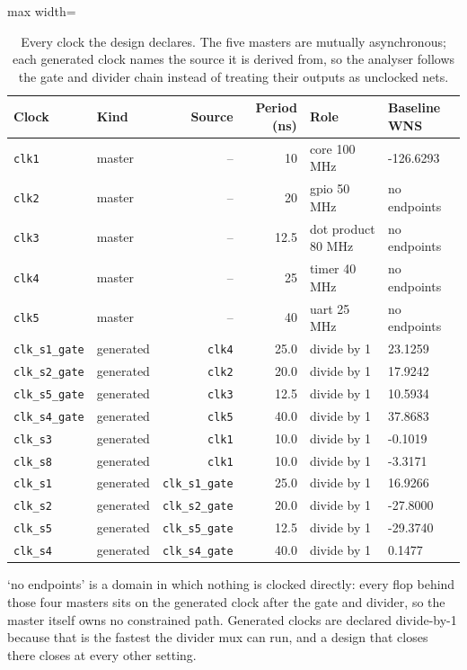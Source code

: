 \begin{table}[htbp]
  \centering
  \footnotesize
  \caption{Every clock the design declares. The five masters are mutually asynchronous; each generated clock names the source it is derived from, so the analyser follows the gate and divider chain instead of treating their outputs as unclocked nets.}
  \label{tab:clocks}
  \begin{adjustbox}{max width=\textwidth}
  \begin{tabular}{llrrll}
    \toprule
    \textbf{Clock} & \textbf{Kind} & \textbf{Source} & \textbf{Period (ns)} & \textbf{Role} & \textbf{Baseline WNS} \\
    \midrule
    \texttt{clk1} & master & -- & 10 & core        100 MHz & -126.6293 \\
    \texttt{clk2} & master & -- & 20 & gpio         50 MHz & {\footnotesize no endpoints} \\
    \texttt{clk3} & master & -- & 12.5 & dot product  80 MHz & {\footnotesize no endpoints} \\
    \texttt{clk4} & master & -- & 25 & timer        40 MHz & {\footnotesize no endpoints} \\
    \texttt{clk5} & master & -- & 40 & uart         25 MHz & {\footnotesize no endpoints} \\
    \texttt{clk\_s1\_gate} & generated & \texttt{clk4} & 25.0 & divide by 1 & 23.1259 \\
    \texttt{clk\_s2\_gate} & generated & \texttt{clk2} & 20.0 & divide by 1 & 17.9242 \\
    \texttt{clk\_s5\_gate} & generated & \texttt{clk3} & 12.5 & divide by 1 & 10.5934 \\
    \texttt{clk\_s4\_gate} & generated & \texttt{clk5} & 40.0 & divide by 1 & 37.8683 \\
    \texttt{clk\_s3} & generated & \texttt{clk1} & 10.0 & divide by 1 & -0.1019 \\
    \texttt{clk\_s8} & generated & \texttt{clk1} & 10.0 & divide by 1 & -3.3171 \\
    \texttt{clk\_s1} & generated & \texttt{clk\_s1\_gate} & 25.0 & divide by 1 & 16.9266 \\
    \texttt{clk\_s2} & generated & \texttt{clk\_s2\_gate} & 20.0 & divide by 1 & -27.8000 \\
    \texttt{clk\_s5} & generated & \texttt{clk\_s5\_gate} & 12.5 & divide by 1 & -29.3740 \\
    \texttt{clk\_s4} & generated & \texttt{clk\_s4\_gate} & 40.0 & divide by 1 & 0.1477 \\
    \bottomrule
  \end{tabular}
  \end{adjustbox}
  \par\smallskip\footnotesize\raggedright `no endpoints' is a domain in which nothing is clocked directly: every flop behind those four masters sits on the generated clock after the gate and divider, so the master itself owns no constrained path. Generated clocks are declared divide-by-1 because that is the fastest the divider mux can run, and a design that closes there closes at every other setting.
\end{table}
